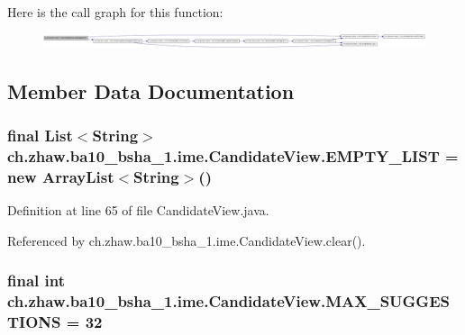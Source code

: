 Here is the call graph for this function:\nopagebreak
\begin{figure}[H]
\begin{center}
\leavevmode
\includegraphics[width=420pt]{classch_1_1zhaw_1_1ba10__bsha__1_1_1ime_1_1CandidateView_af87d8229ab4a607f3a0e60dcfb435562_cgraph}
\end{center}
\end{figure}


\subsection{Member Data Documentation}
\hypertarget{classch_1_1zhaw_1_1ba10__bsha__1_1_1ime_1_1CandidateView_aaf4f6e66871f835ad0f96ebe37a03cb3}{
\subsubsection[{EMPTY\_\-LIST}]{\setlength{\rightskip}{0pt plus 5cm}final List$<$String$>$ {\bf ch.zhaw.ba10\_\-bsha\_\-1.ime.CandidateView.EMPTY\_\-LIST} = new ArrayList$<$String$>$()}}
\label{classch_1_1zhaw_1_1ba10__bsha__1_1_1ime_1_1CandidateView_aaf4f6e66871f835ad0f96ebe37a03cb3}


Definition at line 65 of file CandidateView.java.

Referenced by ch.zhaw.ba10\_\-bsha\_\-1.ime.CandidateView.clear().\hypertarget{classch_1_1zhaw_1_1ba10__bsha__1_1_1ime_1_1CandidateView_a1eebcf5c70a711c20ae8b828c7177fe4}{
\subsubsection[{MAX\_\-SUGGESTIONS}]{\setlength{\rightskip}{0pt plus 5cm}final int {\bf ch.zhaw.ba10\_\-bsha\_\-1.ime.CandidateView.MAX\_\-SUGGESTIONS} = 32}}
\label{classch_1_1zhaw_1_1ba10__bsha__1_1_1ime_1_1CandidateView_a1eebcf5c70a711c20ae8b828c7177fe4}



